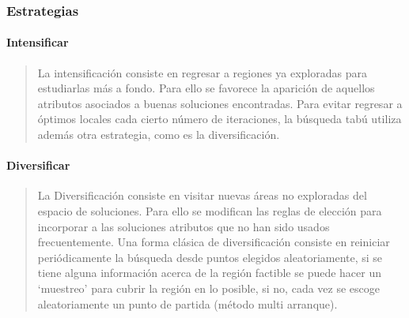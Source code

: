 \subsubsection{Estrategias}
\paragraph{Intensificar}
\begin{quote}La intensificación consiste en regresar a regiones ya exploradas para estudiarlas más a fondo. Para ello se favorece la aparición de aquellos atributos asociados a buenas soluciones encontradas. Para evitar regresar a óptimos locales cada cierto número de iteraciones, la búsqueda tabú utiliza además otra estrategia, como es la diversificación. \cite{RiojasCanari2005BusquedaN-reinas}\end{quote}
\paragraph{Diversificar}
\begin{quote}La Diversificación consiste en visitar nuevas áreas no exploradas del espacio de soluciones. Para ello se modifican las reglas de elección para incorporar a las soluciones atributos que no han sido usados frecuentemente. Una forma clásica de diversificación consiste en reiniciar periódicamente la búsqueda desde puntos elegidos aleatoriamente, si se tiene alguna información acerca de la región factible se puede hacer un ‘muestreo’ para cubrir la región en lo posible, si no, cada vez se escoge aleatoriamente un punto de partida (método multi arranque). \cite{RiojasCanari2005BusquedaN-reinas}\end{quote}

